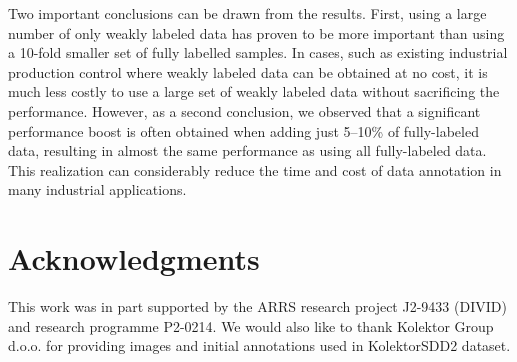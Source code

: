 Two important conclusions can be drawn from the results. First, using a large number of only weakly labeled data has proven to be more important than using a 10-fold smaller set of fully labelled samples. In cases, such as existing industrial production control where weakly labeled data can be obtained at no cost, it is much less costly to use a large set of weakly labeled data without sacrificing the performance. However, as a second conclusion, we observed that a significant performance boost is often obtained when adding just 5--10\% of fully-labeled data, resulting in almost the same performance as using all fully-labeled data.
This realization can considerably reduce the time and cost of data annotation in many industrial applications.

\section*{Acknowledgments}
This work was in part supported by the ARRS research project J2-9433 (DIVID) and research programme P2-0214. We would also like to thank Kolektor Group d.o.o. for providing images and initial annotations used in KolektorSDD2 dataset.

{\small
}

